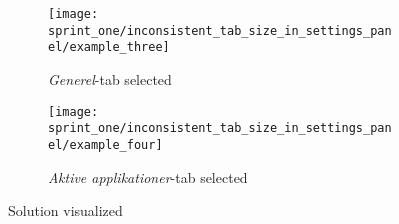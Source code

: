 \begin{figure}[!htbp]
    \centering

    \begin{subfigure}[t]{0.3\textwidth}
        \texttt{[image: sprint\_one/inconsistent\_tab\_size\_in\_settings\_panel/example\_three]}
        \caption{\emph{Generel}-tab selected}
        \label{fig:inconsistent_tab_size_in_settings_panel_example_one_solution}
    \end{subfigure}
    \hspace{5em} 
    \begin{subfigure}[t]{0.3\textwidth}
        \texttt{[image: sprint\_one/inconsistent\_tab\_size\_in\_settings\_panel/example\_four]}
        \caption{\emph{Aktive applikationer}-tab selected}
        \label{fig:inconsistent_tab_size_in_settings_panel_example_two_solution}
    \end{subfigure}
    
    \caption{Solution visualized}
    \label{fig:inconsistent_tab_size_in_settings_panel_example_solution}
\end{figure}